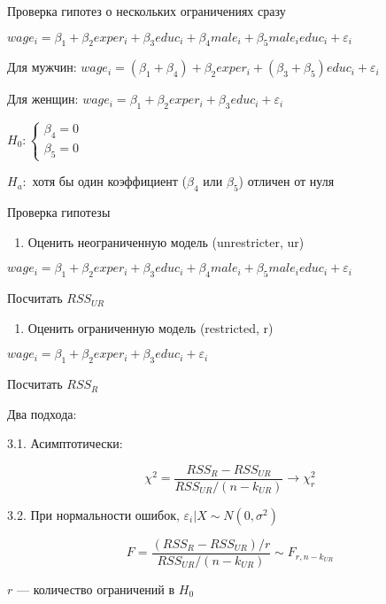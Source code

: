 \documentclass[ignorenonframetext,]{beamer}
\begin{document}
\begin{frame}{Проверка гипотез о нескольких ограничениях сразу}

$wage_i = \beta_1 + \beta_2 exper_i + \beta_3 educ_i + \beta_4 male_i + \beta_5 male_i educ_i + \varepsilon_i$

Для мужчин:
$wage_i = (\beta_1+\beta_4) + \beta_2 exper_i + (\beta_3 + \beta_5) educ_i + \varepsilon_i$

Для женщин:
$wage_i = \beta_1 + \beta_2 exper_i + \beta_3 educ_i + \varepsilon_i$

$H_0: \begin{cases} \beta_4 = 0 \\ \beta_5 = 0 \end{cases}$

$H_a:$ хотя бы один коэффициент ($\beta_4$ или $\beta_5$) отличен от
нуля

\end{frame}

\begin{frame}{Проверка гипотезы}

\begin{enumerate}
\def\labelenumi{\arabic{enumi}.}
\itemsep1pt\parskip0pt
\item
  Оценить неограниченную модель (unrestricter, ur)
\end{enumerate}

$wage_i = \beta_1 + \beta_2 exper_i + \beta_3 educ_i + \beta_4 male_i + \beta_5 male_i educ_i + \varepsilon_i$

Посчитать $RSS_{UR}$

\begin{enumerate}
\def\labelenumi{\arabic{enumi}.}
\setcounter{enumi}{1}
\itemsep1pt\parskip0pt
\item
  Оценить ограниченную модель (restricted, r)
\end{enumerate}

$wage_i = \beta_1 + \beta_2 exper_i + \beta_3 educ_i  + \varepsilon_i$

Посчитать $RSS_{R}$

\end{frame}

\begin{frame}{Два подхода:}

3.1. Асимптотически:

\[
\chi^2=\frac{RSS_R-RSS_{UR}}{RSS_{UR}/(n-k_{UR})} \to \chi^2_r
\]

3.2. При нормальности ошибок, $\varepsilon_i |X \sim N(0,\sigma^2)$

\[
F=\frac{(RSS_R-RSS_{UR})/r}{RSS_{UR}/(n-k_{UR})} \sim F_{r, n-k_{UR}}
\]

$r$ --- количество ограничений в $H_0$

\end{frame}
\end{document}
